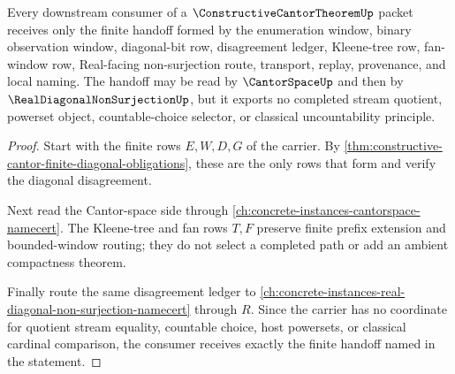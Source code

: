 \begin{theorem}
\label{thm:constructive-cantor-cantor-space-handoff}
Every downstream consumer of a $\ConstructiveCantorTheoremUp$ packet receives only the finite handoff formed by the enumeration window, binary observation window, diagonal-bit row, disagreement ledger, Kleene-tree row, fan-window row, Real-facing non-surjection route, transport, replay, provenance, and local naming. The handoff may be read by $\CantorSpaceUp$ and then by $\RealDiagonalNonSurjectionUp$, but it exports no completed stream quotient, powerset object, countable-choice selector, or classical uncountability principle.
\end{theorem}
\begin{proof}
Start with the finite rows $E,W,D,G$ of the carrier. By \autoref{thm:constructive-cantor-finite-diagonal-obligations}, these are the only rows that form and verify the diagonal disagreement.

Next read the Cantor-space side through \autoref{ch:concrete-instances-cantorspace-namecert}. The Kleene-tree and fan rows $T,F$ preserve finite prefix extension and bounded-window routing; they do not select a completed path or add an ambient compactness theorem.

Finally route the same disagreement ledger to \autoref{ch:concrete-instances-real-diagonal-non-surjection-namecert} through $R$. Since the carrier has no coordinate for quotient stream equality, countable choice, host powersets, or classical cardinal comparison, the consumer receives exactly the finite handoff named in the statement.
\end{proof}




